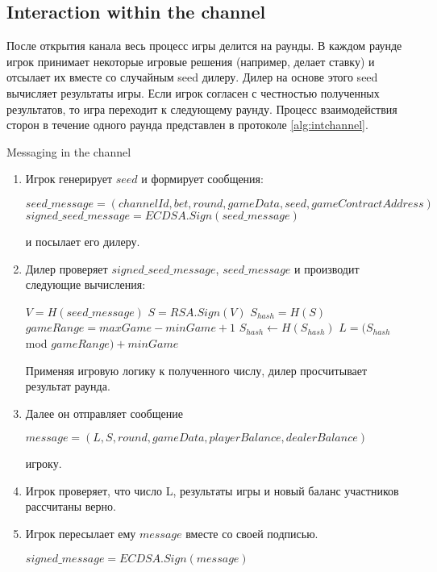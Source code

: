 		\subsection {Interaction within the channel}
После открытия канала весь процесс игры делится на раунды. В каждом раунде игрок принимает некоторые игровые решения (например, делает ставку) и отсылает их вместе со случайным seed дилеру. Дилер на основе этого seed вычисляет результаты игры. Если игрок согласен с честностью полученных результатов, то игра переходит к следующему раунду. Процесс взаимодействия сторон в течение одного раунда представлен в протоколе \autoref{alg:intchannel}. \\
\begin{algorithm}
\caption{Messaging in the channel} \label{alg:intchannel}
\begin{enumerate}
	\item Игрок генерирует $seed$  и  формирует сообщения:
\begin{center}
$ seed\_message = (channelId, bet, round, gameData, seed, gameContractAddress)$
$signed\_seed\_message = ECDSA.Sign(seed\_message)$ 
\end{center}
 и посылает его дилеру. 
	\item Дилер проверяет $signed\_seed\_message$, $seed\_message$ и производит следующие вычисления:
 \begin{algorithmic}
\State $V = H(seed\_message)$
\State $S = RSA.Sign(V)$
\State $S_{hash} = H(S)$
\State $gameRange = maxGame -  minGame + 1$
\State$ S_{hash}\gets H(S_{hash})$
\EndWhile
\State $L = (S_{hash}$ mod $gameRange) + minGame$
 \end{algorithmic}
 Применяя игровую логику к полученного числу, дилер просчитывает результат раунда.
\item Далее он отправляет сообщение
\begin{center}
 $message = (L,S, round, gameData, playerBalance, dealerBalance)$
\end{center}
 игроку.
	\item Игрок проверяет, что число L, результаты игры и новый баланс участников рассчитаны верно.
	\item Игрок пересылает ему $message$ вместе со своей подписью. 
\begin{center}
 $signed\_message = ECDSA.Sign(message)$
\end{center}
\end{enumerate}
\end{algorithm}



